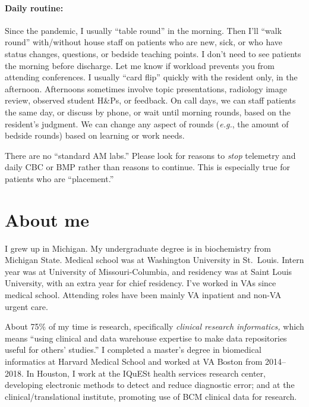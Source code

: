 \documentclass{tufte-handout}
\begin{document}
\paragraph{Daily routine:} Since the pandemic, I usually ``table
round'' in the morning. Then I'll ``walk round'' with/without house
staff on patients who are new, sick, or who have status changes,
questions, or bedside teaching points. I don't need to see patients
the morning before discharge. Let me know if workload prevents you
from attending conferences. I usually ``card flip'' quickly with the
resident only, in the afternoon. Afternoons sometimes involve topic
presentations, radiology image review, observed student H\&Ps, or
feedback. On call days, we can staff patients the same day, or discuss
by phone, or wait until morning rounds, based on the resident's
judgment. We can change any aspect of rounds (\emph{e.g.}, the amount
of bedside rounds) based on learning or work needs.

There are no ``standard AM labs.'' Please look for reasons to
\emph{stop} telemetry and daily CBC or BMP rather than reasons to
continue. This is especially true for patients who are ``placement.''




\section{About me}

I grew up in Michigan. My undergraduate degree is in biochemistry from
Michigan State. Medical school was at Washington University in
St.\ Louis. Intern year was at University of Missouri-Columbia, and
residency was at Saint Louis University, with an extra year for chief
residency. I've worked in VAs since medical school. Attending roles
have been mainly VA inpatient and non-VA urgent care.


About 75\% of my time is research, specifically \emph{clinical
research informatics,} which means ``using clinical and data warehouse
expertise to make data repositories useful for others' studies.'' I
completed a master's degree in biomedical informatics at Harvard
Medical School and worked at VA Boston from 2014--2018. In Houston, I
work at the IQuESt health services research center, developing
electronic methods to detect and reduce diagnostic error; and at the
clinical/translational institute, promoting use of BCM clinical data
for research.
\end{document}

